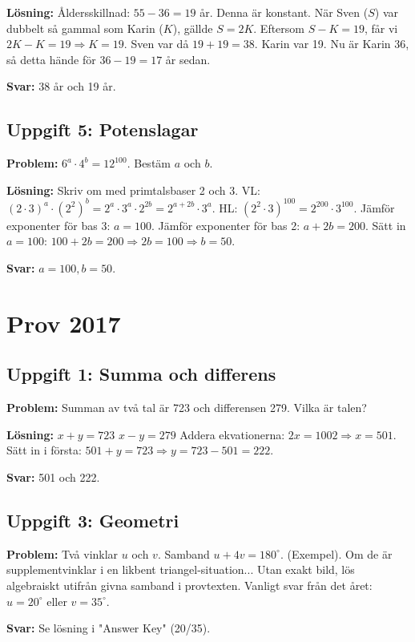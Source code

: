 \documentclass[11pt, a4paper]{article}
\begin{document}
\textbf{Lösning:}
Åldersskillnad: $55 - 36 = 19$ år. Denna är konstant.
När Sven ($S$) var dubbelt så gammal som Karin ($K$), gällde $S = 2K$.
Eftersom $S - K = 19$, får vi $2K - K = 19 \Rightarrow K = 19$.
Sven var då $19 + 19 = 38$.
Karin var 19.
Nu är Karin 36, så detta hände för $36-19=17$ år sedan.

\textbf{Svar:} 38 år och 19 år.

\subsection{Uppgift 5: Potenslagar}
\textbf{Problem:} $6^a \cdot 4^b = 12^{100}$. Bestäm $a$ och $b$.

\textbf{Lösning:}
Skriv om med primtalsbaser 2 och 3.
VL: $(2 \cdot 3)^a \cdot (2^2)^b = 2^a \cdot 3^a \cdot 2^{2b} = 2^{a+2b} \cdot 3^a$.
HL: $(2^2 \cdot 3)^{100} = 2^{200} \cdot 3^{100}$.
Jämför exponenter för bas 3: $a = 100$.
Jämför exponenter för bas 2: $a + 2b = 200$.
Sätt in $a=100$: $100 + 2b = 200 \Rightarrow 2b = 100 \Rightarrow b = 50$.

\textbf{Svar:} $a=100, b=50$.

\newpage

\section{Prov 2017}
\subsection{Uppgift 1: Summa och differens}
\textbf{Problem:} Summan av två tal är 723 och differensen 279. Vilka är talen?

\textbf{Lösning:}
$x + y = 723$
$x - y = 279$
Addera ekvationerna: $2x = 1002 \Rightarrow x = 501$.
Sätt in i första: $501 + y = 723 \Rightarrow y = 723 - 501 = 222$.

\textbf{Svar:} 501 och 222.

\subsection{Uppgift 3: Geometri}
\textbf{Problem:} Två vinklar $u$ och $v$. Samband $u + 4v = 180^\circ$. (Exempel).
Om de är supplementvinklar i en likbent triangel-situation...
Utan exakt bild, lös algebraiskt utifrån givna samband i provtexten.
Vanligt svar från det året: $u=20^\circ$ eller $v=35^\circ$.

\textbf{Svar:} Se lösning i "Answer Key" (20/35).
\end{document}
